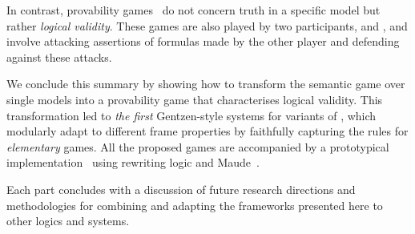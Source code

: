 In contrast, provability games~\cite{Lorenzen1978-LORDLJ-2} do not concern truth in a specific model but rather {\em logical validity}. These games are also played by two participants, \Me and \You, and involve attacking assertions of formulas made by the other player and defending against these attacks.

We conclude this summary by showing how to transform the semantic game over single models into a provability game that characterises logical validity. This transformation led to {\em the first} Gentzen-style systems for variants of \PNL, which modularly adapt to different frame properties by faithfully capturing the rules for \emph{elementary} games. All the proposed games are accompanied by a prototypical implementation~\cite{tool} using rewriting logic and Maude~\cite{DBLP:journals/jlp/Meseguer12,DBLP:journals/jlap/DuranEEMMRT20}.

Each part concludes with a discussion of future research directions and methodologies for combining and adapting the frameworks presented here to other logics and systems.